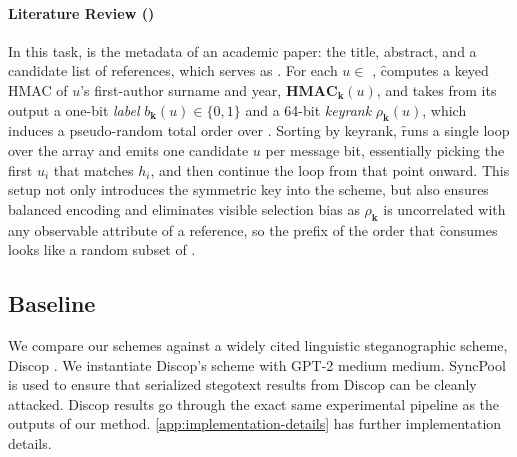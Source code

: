 

\paragraph{Literature Review (\lr)}
In this task, \inp is the metadata of an academic paper: the title, abstract, and a candidate list of references, which serves as \units. 
For each $u \in$ \units, \f computes a keyed HMAC of $u$'s first-author surname and year, $\mathbf{HMAC_k}(u)$, and takes from its output a one-bit \emph{label} $b_\mathbf{k}(u) \in \{0,1\}$ and a 64-bit \emph{keyrank} $\rho_\mathbf{k}(u)$, which induces a pseudo-random total order over \units.
Sorting \units by keyrank, \f runs a single loop over the array and emits one candidate $u$ per message bit, essentially picking the first $u_i$ that matches $h_i$, and then continue the loop from that point onward.
This setup not only introduces the symmetric key into the scheme, but also ensures balanced encoding and eliminates visible selection bias as $\rho_\mathbf{k}$ is uncorrelated with any observable attribute of a reference, so the prefix of the order that \f consumes looks like a random subset of \units.

\subsection{Baseline}
\label{subsec:baselines}
We compare our schemes against a widely cited linguistic steganographic scheme, Discop \citep{ding2023discop}.
We instantiate Discop's scheme with GPT-2 medium \citep{radford2019language} medium. 
SyncPool \citep{qi2024provably} is used to ensure that serialized stegotext results from Discop can be cleanly attacked.
Discop results go through the exact same experimental pipeline as the outputs of our method. \autoref{app:implementation-details} has further implementation details.


